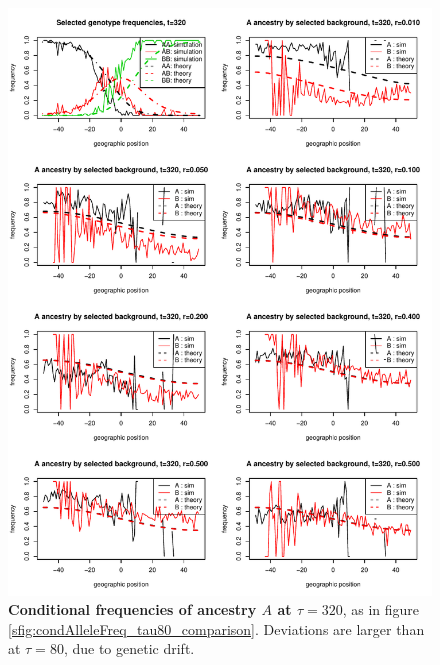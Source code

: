 \begin{figure}
    \includegraphics{figs/cond_freqs_comparison_tau_320}
    \caption{
        \textbf{Conditional frequencies of ancestry $A$ at $\tau=320$},
        as in figure \ref{sfig:condAlleleFreq_tau80_comparison}.
        Deviations are larger than at $\tau=80$, 
        due to genetic drift.
    } \label{sfig:condAlleleFreq_tau320_comparison}
\end{figure}


